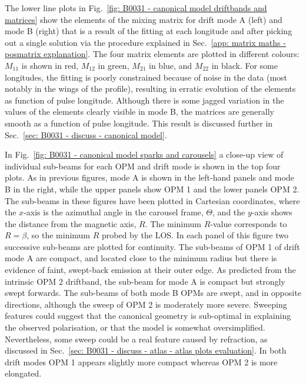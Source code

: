 The lower line plots in Fig.~\ref{fig: B0031 - canonical model driftbands and matrices} show the elements of the mixing matrix for drift mode A (left) and mode B (right) that is a result of the fitting at each longitude and after picking out a single solution via the procedure explained in Sec.~\ref{app: matrix maths - posmatrix explanation}. The four matrix elements are plotted in different colours: $M_{11}$ is shown in red, $M_{12}$ in green, $M_{21}$ in blue, and $M_{22}$ in black. For some longitudes, the fitting is poorly constrained because of noise in the data (most notably in the wings of the profile), resulting in erratic evolution of the elements as function of pulse longitude. Although there is some jagged variation in the values of the elements clearly visible in mode B, the matrices are generally smooth as a function of pulse longitude. This result is discussed further in Sec.~\ref{sec: B0031 - discuss - canonical model}.

In Fig.~\ref{fig: B0031 - canonical model sparks and carousels} a close-up view of individual sub-beams for each OPM and drift mode is shown in the top four plots. As in previous figures, mode A is shown in the left-hand panels and mode B in the right, while the upper panels show OPM 1 and the lower panels OPM 2. The sub-beams in these figures have been plotted in Cartesian coordinates, where the $x$-axis is the azimuthal angle in the carousel frame, $\Theta$, and the $y$-axis shows the distance from the magnetic axis, $R$. The minimum $R$-value corresponds to $R=\beta$, so the minimum $R$ probed by the LOS. In each panel of this figure two successive sub-beams are plotted for continuity. The sub-beams of OPM 1 of drift mode A are compact, and located close to the minimum radius but there is evidence of faint, swept-back emission at their outer edge. As predicted from the intrinsic OPM 2 driftband, the sub-beam for mode A is compact but strongly swept forwards. The sub-beams of both mode B OPMs are swept, and in opposite directions, although the sweep of OPM 2 is moderately more severe. Sweeping features could suggest that the canonical geometry is sub-optimal in explaining the observed polarisation, or that the model is somewhat oversimplified. Nevertheless, some sweep could be a real feature caused by refraction, as discussed in Sec.~\ref{sec: B0031 - discuss - atlas - atlas plots evaluation}. In both drift modes OPM 1 appears slightly more compact whereas OPM 2 is more elongated.

